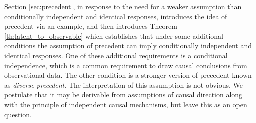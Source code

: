 \documentclass{article}
\begin{document}
Section \ref{sec:precedent}, in response to the need for a weaker assumption than conditionally independent and identical responses, introduces the idea of precedent via an example, and then introduces Theorem \ref{th:latent_to_observable} which establishes that under some additional conditions the assumption of precedent can imply conditionally independent and identical responses. One of these additional requirements is a conditional independence, which is a common requirement to draw causal conclusions from observational data. The other condition is a stronger version of precedent known as \emph{diverse precedent}. The interpretation of this assumption is not obvious. We postulate that it may be derivable from assumptions of causal direction along with the principle of independent causal mechanisms, but leave this as an open question.









\appendix


\end{document}
